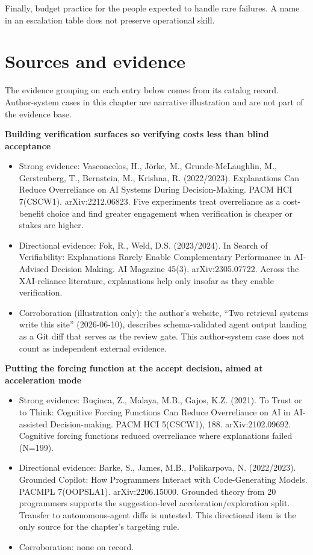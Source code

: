 Finally, budget practice for the people expected to handle rare failures. A name in an escalation table does not preserve operational skill.

\section*{Sources and evidence}

The evidence grouping on each entry below comes from its catalog record. Author-system cases in this chapter are narrative illustration and are not part of the evidence base.

\textbf{Building verification surfaces so verifying costs less than blind acceptance}

\begin{itemize}
\tightlist
\item
  Strong evidence: Vasconcelos, H., Jörke, M., Grunde-McLaughlin, M., Gerstenberg, T., Bernstein, M., Krishna, R. (2022/2023). Explanations Can Reduce Overreliance on AI Systems During Decision-Making. PACM HCI 7(CSCW1). arXiv:2212.06823. Five experiments treat overreliance as a cost-benefit choice and find greater engagement when verification is cheaper or stakes are higher.
\item
  Directional evidence: Fok, R., Weld, D.S. (2023/2024). In Search of Verifiability: Explanations Rarely Enable Complementary Performance in AI-Advised Decision Making. AI Magazine 45(3). arXiv:2305.07722. Across the XAI-reliance literature, explanations help only insofar as they enable verification.
\item
  Corroboration (illustration only): the author's website, ``Two retrieval systems write this site'' (2026-06-10), describes schema-validated agent output landing as a Git diff that serves as the review gate. This author-system case does not count as independent external evidence.
\end{itemize}

\textbf{Putting the forcing function at the accept decision, aimed at acceleration mode}

\begin{itemize}
\tightlist
\item
  Strong evidence: Buçinca, Z., Malaya, M.B., Gajos, K.Z. (2021). To Trust or to Think: Cognitive Forcing Functions Can Reduce Overreliance on AI in AI-assisted Decision-making. PACM HCI 5(CSCW1), 188. arXiv:2102.09692. Cognitive forcing functions reduced overreliance where explanations failed (N=199).
\item
  Directional evidence: Barke, S., James, M.B., Polikarpova, N. (2022/2023). Grounded Copilot: How Programmers Interact with Code-Generating Models. PACMPL 7(OOPSLA1). arXiv:2206.15000. Grounded theory from 20 programmers supports the suggestion-level acceleration/exploration split. Transfer to autonomous-agent diffs is untested. This directional item is the only source for the chapter's targeting rule.
\item
  Corroboration: none on record.
\end{itemize}

